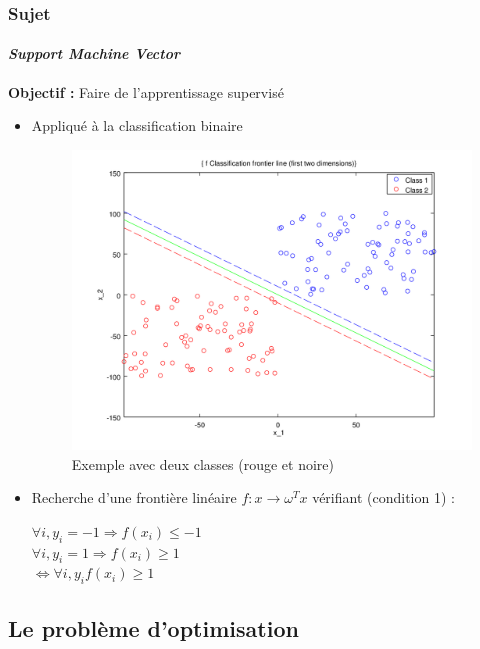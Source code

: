 \documentclass{beamer}
\begin{document}
\begin{frame}
\frametitle{Sujet}
\framesubtitle{\emph{Support Machine Vector}}

\begin{center}
\textbf{Objectif :} Faire de l'apprentissage supervisé
\end{center}

\begin{itemize}
\item Appliqué à la classification binaire

         \begin{figure}
         \centering
         \caption{Exemple avec deux classes (rouge et noire)}
         \includegraphics[scale=0.3]{images/voronoi.png}
         \end{figure}

\item Recherche d'une frontière linéaire $f : x \rightarrow \omega^Tx$ vérifiant (condition 1) :

         \begin{center}
         $\forall i, y_i = -1 \Rightarrow f(x_i) \leq -1$\\
         $\forall i, y_i = 1 \Rightarrow f(x_i) \geq 1$\\
         $\Leftrightarrow \forall i, y_i f(x_i) \geq 1$
         \end{center}
\end{itemize}

\end{frame}

\subsection{Le problème d'optimisation}
\end{document}
